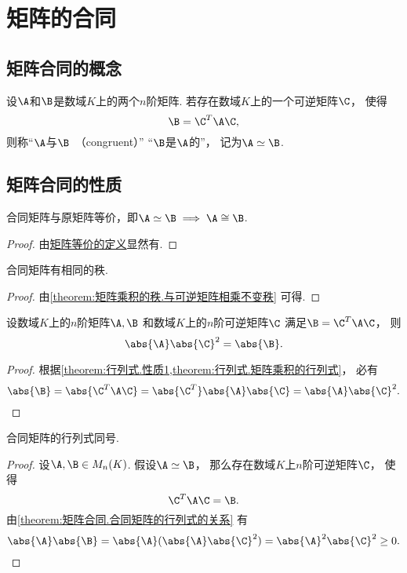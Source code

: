 \section{矩阵的合同}
\subsection{矩阵合同的概念}
\begin{definition}
设\(\A\)和\(\B\)是数域\(K\)上的两个\(n\)阶矩阵.
若存在数域\(K\)上的一个可逆矩阵\(\C\)，
使得\[
	\B=\C^T\A\C,
\]
则称“\(\A\)与\(\B\)~（congruent）”
“\(\B\)是\(\A\)的”，
记为\(\A\simeq\B\).
\end{definition}

\subsection{矩阵合同的性质}
\begin{property}
合同矩阵与原矩阵等价，即\(\A\simeq\B \implies \A\cong\B\).
\begin{proof}
由\hyperref[definition:逆矩阵.矩阵等价]{矩阵等价的定义}显然有.
\end{proof}
\end{property}

\begin{property}
合同矩阵有相同的秩.
\begin{proof}
由\cref{theorem:矩阵乘积的秩.与可逆矩阵相乘不变秩} 可得.
\end{proof}
\end{property}

\begin{proposition}\label{theorem:矩阵合同.合同矩阵的行列式的关系}
设数域\(K\)上的\(n\)阶矩阵\(\A,\B\)
和数域\(K\)上的\(n\)阶可逆矩阵\(\C\)
满足\(\B = \C^T \A \C\)，
则\[
	\abs{\A} \abs{\C}^2
	= \abs{\B}.
\]
\begin{proof}
根据\cref{theorem:行列式.性质1,theorem:行列式.矩阵乘积的行列式}，
必有\[
	\abs{\B}
	= \abs{\C^T \A \C}
	= \abs{\C^T} \abs{\A} \abs{\C}
	= \abs{\A} \abs{\C}^2.
	\qedhere
\]
\end{proof}
\end{proposition}

\begin{proposition}
合同矩阵的行列式同号.
\begin{proof}
设\(\A,\B \in M_n(K)\).
假设\(\A\simeq\B\)，
那么存在数域\(K\)上\(n\)阶可逆矩阵\(\C\)，
使得\[
	\C^T \A \C = \B.
\]
由\cref{theorem:矩阵合同.合同矩阵的行列式的关系} 有\[
	\abs{\A} \abs{\B}
	= \abs{\A} (\abs{\A} \abs{\C}^2)
	= \abs{\A}^2 \abs{\C}^2
	\geq 0.
	\qedhere
\]
\end{proof}
\end{proposition}


